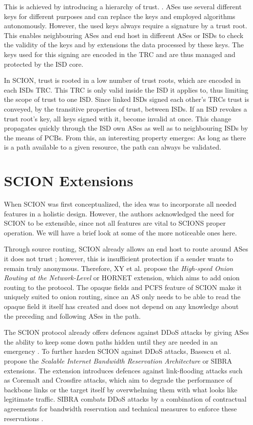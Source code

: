 \documentclass[../eva1_scion.tex]{subfiles}
\begin{document}
    This is achieved by introducing a hierarchy of trust. \cite{scion_2011}. ASes use several different keys for different purposes and can replace the keys and employed algorithms autonomously. However, the used keys always require a signature by a trust root. This enables neighbouring ASes and end host in different ASes or ISDs to check the validity of the keys and by extensions the data processed by these keys. The keys used for this signing are encoded in the TRC and are thus managed and protected by the ISD core.

    In SCION, trust is rooted in a low number of trust roots, which are encoded in each ISDs TRC. This TRC is only valid inside the ISD it applies to, thus limiting the scope of trust to one ISD. Since linked ISDs signed each other's TRCs trust is conveyed, by the transitive properties of trust, between ISDs. If an ISD revokes a trust root's key, all keys signed with it, become invalid at once. This change propagates quickly through the ISD own ASes as well as to neighbouring ISDs by the means of PCBs. From this, an interesting property emerges: As long as there is a path available to a given resource, the path can always be validated.

    \section{SCION Extensions}
    When SCION was first conceptualized, the idea was to incorporate all needed features in a holistic design. However, the authors acknowledged the need for SCION to be extensible, since not all features are vital to SCIONS proper operation. We will have a brief look at some of the more noticeable ones here.

    Through source routing, SCION already allows an end host to route around ASes it does not trust \cite{scion_2011}; however, this is insufficient protection if a sender wants to remain truly anonymous. Therefore, XY et al. propose the \textit{High-speed Onion Routing at the Network-Level} \cite{hornet_2015, hornet_2016} or HORNET extension, which aims to add onion routing \cite{onion_routing} to the protocol. The opaque fields and PCFS feature of SCION make it uniquely suited to onion routing, since an AS only needs to be able to read the opaque field it itself has created and does not depend on any knowledge about the preceding and following ASes in the path.

    The SCION protocol already offers defences against DDoS attacks by giving ASes the ability to keep some down paths hidden until they are needed in an emergency \cite{scion_2015}. To further harden SCION against DDoS attacks, Basescu et al. propose the \textit{Scalable Internet Bandwidth Reservation Architecture} \cite{sibra_2016} or SIBRA extensions. The extension introduces defences against link-flooding attacks such as Coremalt \cite{coremelt} and Crossfire \cite{crossfire} attacks, which aim to degrade the performance of backbone links or the target itself by overwhelming them with what looks like legitimate traffic. SIBRA combats DDoS attacks by a combination of contractual agreements for bandwidth reservation and technical measures to enforce these reservations \cite{sibra_2016}.
\end{document}
